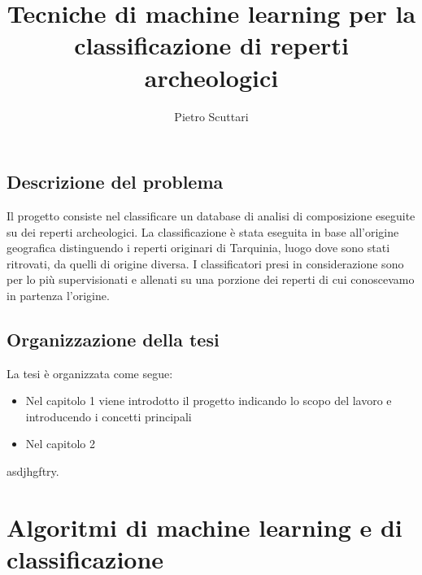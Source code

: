 \documentclass[a4paper,12pt]{report}
\begin{document}
\title{Tecniche di machine learning per la classificazione di reperti archeologici}
\author{Pietro Scuttari}
%
% 
%
\beforepreface
% 
%
\section{Descrizione del problema} %
Il progetto consiste nel classificare un database di analisi di composizione
eseguite su dei reperti archeologici. La classificazione è stata eseguita in
base all'origine geografica distinguendo i reperti originari di Tarquinia, luogo
dove sono stati ritrovati, da quelli di origine diversa. I classificatori presi
in considerazione sono per lo più supervisionati e allenati su una porzione dei
reperti di cui conoscevamo in partenza l'origine.
%
%
\section{Organizzazione della tesi}
\label{organizzazione}
La tesi \`e organizzata come segue:
\begin{itemize}
	\item Nel capitolo 1 viene introdotto il progetto indicando lo scopo del
lavoro e introducendo i concetti principali
	\item Nel capitolo 2 

\end{itemize}
%
%
asdjhgftry.
\afterpreface
% 
% 
\chapter{Algoritmi di machine learning e di classificazione}
\label{cap1}
\end{document}
